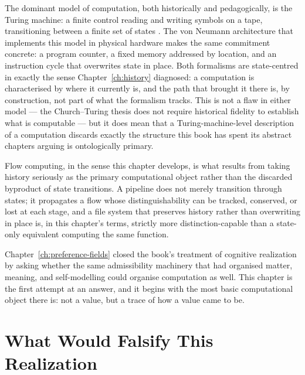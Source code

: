 \documentclass[12pt,twoside,openright]{book}
\begin{document}
The dominant model of computation, both historically and
pedagogically, is the Turing machine: a finite control
reading and writing symbols on a tape, transitioning between
a finite set of states \parencite{turing1936}. The von Neumann
architecture that implements this model in physical hardware
makes the same commitment concrete: a program counter,
a fixed memory addressed by location, and an instruction
cycle that overwrites state in place. Both formalisms are
state-centred in exactly the sense Chapter~\ref{ch:history}
diagnosed: a computation is characterised by where it
currently is, and the path that brought it there is, by
construction, not part of what the formalism tracks. This is
not a flaw in either model --- the Church--Turing thesis does
not require historical fidelity to establish what is
computable --- but it does mean that a Turing-machine-level
description of a computation discards exactly the structure
this book has spent its abstract chapters arguing is
ontologically primary.

Flow computing, in the sense this chapter develops, is what
results from taking history seriously as the primary
computational object rather than the discarded byproduct of
state transitions. A pipeline does not merely transition
through states; it propagates a flow whose distinguishability
can be tracked, conserved, or lost at each stage, and a file
system that preserves history rather than overwriting in
place is, in this chapter's terms, strictly more
distinction-capable than a state-only equivalent computing
the same function.

Chapter~\ref{ch:preference-fields} closed the book's treatment
of cognitive realization by asking whether the same
admissibility machinery that had organised matter, meaning,
and self-modelling could organise computation as well. This
chapter is the first attempt at an answer, and it begins with
the most basic computational object there is: not a value, but
a trace of how a value came to be.

\section{What Would Falsify This Realization}
\label{sec:ch23-falsifiability}
\end{document}
